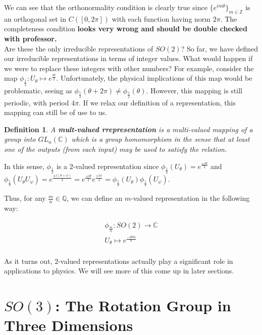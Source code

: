 \documentclass[10pt]{ucthesis}
\newcommand{\Z}{\mathbb{Z}}
\newcommand{\C}{\mathbb{C}}
\newcommand{\Q}{\mathbb{Q}}
\newtheorem{definition}{Definition}[chapter]
\begin{document}
We can see that the orthonormality condition is clearly true since $\{e^{im\theta}\}_{m\in\Z}$ is an orthogonal set in $C([0,2\pi])$ with each function having norm $2\pi$. The completeness condition \textbf{looks very wrong and should be double checked with professor.} \\


Are these the only irreducible representations of $SO(2)$? So far, we have defined our irreducible representations in terms of integer values. What would happen if we were to replace these integers with other numbers? For example, consider the map $\phi_{\frac{1}{2}}: U_\theta \mapsto e^\frac{i\theta}{2}$. Unfortunately, the physical implications of this map would be problematic, seeing as $\phi_\frac{1}{2}(\theta + 2\pi) \neq  \phi_\frac{1}{2}(\theta)$. However, this mapping is still periodic, with period $4\pi$. If we relax our definition of a representation, this mapping can still be of use to us.

\begin{definition}
	A \textbf{mult-valued rrepresentation} is a multi-valued mapping of a group into $GL_n(\C)$ which is a group homomorphism in the sense that at least one of the outputs (from each input) may be used to satisfy the relation.
\end{definition}

In this sense, $\phi_{\frac{1}{2}}$ is a $2$-valued representation since $\phi_{\frac{1}{2}}(U_\theta) = e^\frac{\pm i\theta}{2}$ and $\phi_{\frac{1}{2}}(U_\theta U_\psi) =  e^\frac{\pm i(\theta + \psi)}{2} =  e^\frac{\pm i\theta}{2} e^\frac{\pm i\psi}{2} = \phi_{\frac{1}{2}}(U_\theta)\phi_{\frac{1}{2}}(U_\psi)$.

Thus, for any $\frac{m}{n} \in \Q$, we can define an $m$-valued representation in the following way:

$$\begin{aligned}
	\phi_\frac{m}{n}:SO(2)\rightarrow \C \\
	U_\theta \mapsto e^\frac{-i\theta m}{n} \\
\end{aligned}$$

As it turns out, $2$-valued representations actually play a significant role in applications to physics. We will see more of this come up in later sections.

\chapter{$SO(3)$: The Rotation Group in Three Dimensions}
\end{document}
